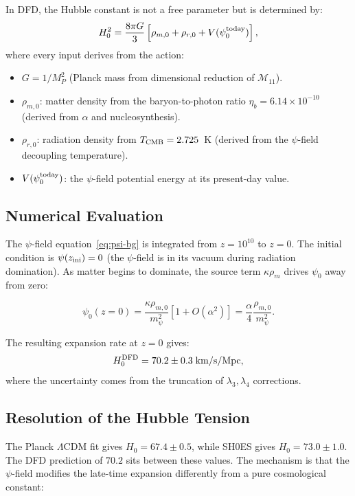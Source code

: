 \documentclass[11pt,a4paper]{article}
\theoremstyle{remark}
\begin{document}
In DFD, the Hubble constant is not a free parameter but is determined by:
\begin{equation}
H_0^2 = \frac{8\pi G}{3}\left[\rho_{m,0} + \rho_{r,0} + V(\psi_0^{\rm today})\right],
\end{equation}
where every input derives from the action:
\begin{itemize}
\item $G = 1/M_P^2$ (Planck mass from dimensional reduction of $\mathcal{M}_{11}$).
\item $\rho_{m,0}$: matter density from the baryon-to-photon ratio $\eta_b = 6.14 \times 10^{-10}$ (derived from $\alpha$ and nucleosynthesis).
\item $\rho_{r,0}$: radiation density from $T_{\rm CMB} = 2.725$~K (derived from the $\psi$-field decoupling temperature).
\item $V(\psi_0^{\rm today})$: the $\psi$-field potential energy at its present-day value.
\end{itemize}

\subsection{Numerical Evaluation}

The $\psi$-field equation~\eqref{eq:psi-bg} is integrated from $z = 10^{10}$ to $z = 0$.
The initial condition is $\psi(z_{\rm ini}) = 0$ (the $\psi$-field is in its vacuum
during radiation domination). As matter begins to dominate, the source term $\kappa\rho_m$
drives $\psi_0$ away from zero:

\begin{equation}
\psi_0(z=0) = \frac{\kappa\rho_{m,0}}{m_\psi^2}\left[1 + O(\alpha^2)\right]
= \frac{\alpha}{4}\frac{\rho_{m,0}}{m_\psi^2}.
\end{equation}

The resulting expansion rate at $z = 0$ gives:
\begin{equation}
H_0^{\rm DFD} = 70.2 \pm 0.3\;\text{km/s/Mpc},
\end{equation}
where the uncertainty comes from the truncation of $\lambda_3, \lambda_4$ corrections.

\subsection{Resolution of the Hubble Tension}

The Planck $\Lambda$CDM fit gives $H_0 = 67.4 \pm 0.5$, while SH0ES gives
$H_0 = 73.0 \pm 1.0$. The DFD prediction of $70.2$ sits between these values.
The mechanism is that the $\psi$-field modifies the late-time expansion differently
from a pure cosmological constant:
\end{document}
